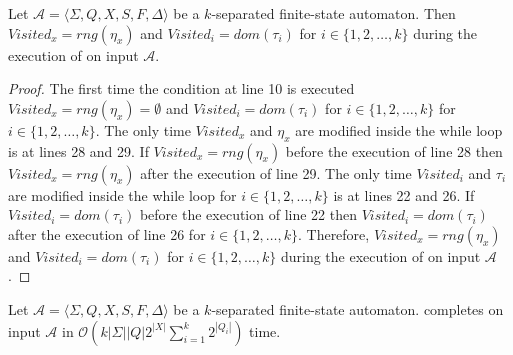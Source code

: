  \begin{proposition}\label{prop:quasidet_auto_2}
    Let $\mathcal{A} = \langle \Sigma, Q, X, S, F, \Delta \rangle$ be a
    $k$-separated finite-state automaton. Then $Visited_x = rng(\eta_x)$ and
    $Visited_i = dom(\tau_i)$ for $i \in \{ 1, 2, \ldots, k \}$ during the execution
    of  on input $\mathcal{A}$.
  \end{proposition}

  \begin{proof}
    The first time the condition at line 10 is executed $Visited_x = rng(\eta_x)
      = \emptyset$ and $Visited_i = dom(\tau_i)$ for $i \in \{ 1, 2, \ldots, k \}$ for
    $i \in \{ 1, 2, \ldots, k \}$. The only time $Visited_x$ and $\eta_x$ are modified
    inside the while loop is at lines 28 and 29. If $Visited_x = rng(\eta_x)$
    before the execution of line 28 then $Visited_x = rng(\eta_x)$ after the
    execution of line 29. The only time $Visited_i$ and $\tau_i$ are modified
    inside the while loop for $i \in \{ 1, 2, \ldots, k \}$ is at lines 22 and 26.
    If $Visited_i = dom(\tau_i)$ before the execution of line 22 then $Visited_i
      = dom(\tau_i)$ after the execution of line 26 for $i \in \{ 1, 2, \ldots, k \}$.
    Therefore, $Visited_x = rng(\eta_x)$ and $Visited_i = dom(\tau_i)$ for $i
      \in \{ 1, 2, \ldots, k \}$ during the execution of 
    on input $\mathcal{A}$.
  \end{proof}

  \begin{proposition}
    Let $\mathcal{A} = \langle \Sigma, Q, X, S, F, \Delta \rangle$ be a
    $k$-separated finite-state automaton. 
    completes on input $\mathcal{A}$ in $\mathcal{O}(k |\Sigma| |Q| 2^{|X|}
      \sum_{i=1}^k 2^{|Q_i|})$ time.
  \end{proposition}

